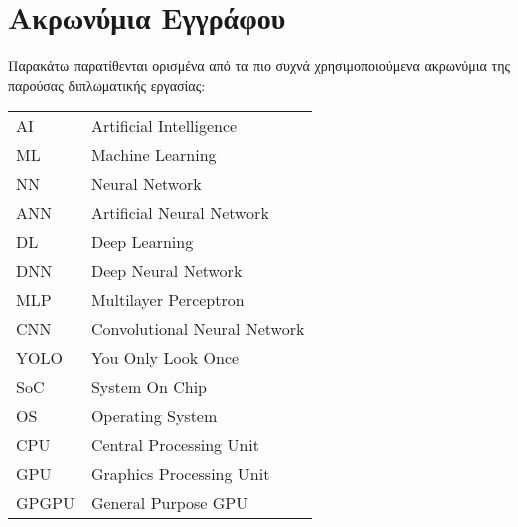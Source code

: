 \chapter*{Ακρωνύμια Εγγράφου}
\label{append:acronyms}
{}

Παρακάτω παρατίθενται ορισμένα από τα πιο συχνά χρησιμοποιούμενα ακρωνύμια της
παρούσας διπλωματικής εργασίας:

\begin{table}[htpb]
  \centering
  \begin{tabular}{l@{$\;\;\longrightarrow\;\;$}l}
    AI & Artificial Intelligence \\
    ML & Machine Learning \\
    NN & Neural Network \\
    ANN & Artificial Neural Network \\
    DL & Deep Learning \\
    DNN & Deep Neural Network \\
    MLP & Multilayer Perceptron \\
    CNN & Convolutional Neural Network \\
    YOLO & You Only Look Once \\
    SoC & System On Chip \\
    OS & Operating System \\
    CPU & Central Processing Unit \\
    GPU & Graphics Processing Unit \\
    GPGPU & General Purpose GPU
  \end{tabular}
\end{table}
